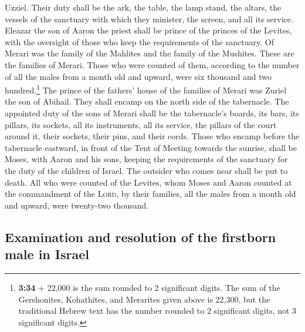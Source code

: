Uzziel.  Their duty shall be the ark, the table, the lamp
stand, the altars, the vessels of the sanctuary with which they
minister, the screen, and all its service.  Eleazar the
son of Aaron the priest shall be prince of the princes of the Levites,
with the oversight of those who keep the requirements of the sanctuary.
 Of Merari was the family of the Mahlites and the family
of the Mushites. These are the families of Merari.  Those
who were counted of them, according to the number of all the males from
a month old and upward, were six thousand and two hundred.\footnote{\textbf{3:34}
  + 22,000 is the sum rounded to 2 significant digits. The sum of the
  Gershonites, Kohathites, and Merarites given above is 22,300, but the
  traditional Hebrew text has the number rounded to 2 significant
  digits, not 3 significant digits.}  The prince of the
fathers' house of the families of Merari was Zuriel the son of Abihail.
They shall encamp on the north side of the tabernacle. 
The appointed duty of the sons of Merari shall be the tabernacle's
boards, its bars, its pillars, its sockets, all its instruments, all its
service,  the pillars of the court around it, their
sockets, their pins, and their cords.  Those who encamp
before the tabernacle eastward, in front of the Tent of Meeting towards
the sunrise, shall be Moses, with Aaron and his sons, keeping the
requirements of the sanctuary for the duty of the children of Israel.
The outsider who comes near shall be put to death.  All
who were counted of the Levites, whom Moses and Aaron counted at the
commandment of the \textsc{Lord}, by their families, all the males from
a month old and upward, were twenty-two thousand.

\hypertarget{examination-and-resolution-of-the-firstborn-male-in-israel}{%
\subsection{Examination and resolution of the firstborn male in
Israel}\label{examination-and-resolution-of-the-firstborn-male-in-israel}}

